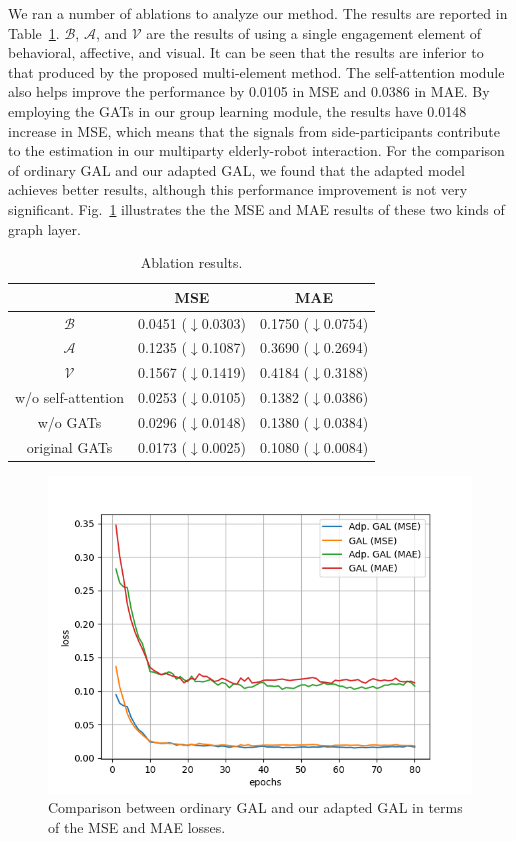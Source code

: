\documentclass[VANCOUVER,STIX1COL]{WileyNJD-v2}
\begin{document}
We ran a number of ablations to analyze our method. The results are reported in Table~\ref{t:ablations}. $\mathcal{B}$, $\mathcal{A}$, and $\mathcal{V}$ are the results of using a single engagement element of behavioral, affective, and visual. It can be seen that the results are inferior to that produced by the proposed multi-element method. The self-attention module also helps improve the performance by 0.0105 in MSE and 0.0386 in MAE. By employing the GATs in our group learning module, the results have 0.0148 increase in MSE, which means that the signals from side-participants contribute to the estimation in our multiparty elderly-robot interaction. For the comparison of ordinary GAL and our adapted GAL, we found that the adapted model achieves better results, although this performance improvement is not very significant. Fig.~\ref{f:gal_vs_adpgal} illustrates the the MSE and MAE results of these two kinds of graph layer.

\begin{table}[ht]
  \centering
  \caption{Ablation results.}
  \label{t:ablations}
  \begin{tabular}{ccc}
  \toprule
  \textbf{} & \textbf{MSE} & \textbf{MAE} \\
  \midrule
  $\mathcal{B}$ & 0.0451 ($\downarrow$0.0303) & 0.1750 ($\downarrow$0.0754) \\
  $\mathcal{A}$ & 0.1235 ($\downarrow$0.1087) & 0.3690 ($\downarrow$0.2694) \\
  $\mathcal{V}$ & 0.1567 ($\downarrow$0.1419) & 0.4184 ($\downarrow$0.3188) \\
  w/o self-attention & 0.0253 ($\downarrow$0.0105) & 0.1382 ($\downarrow$0.0386) \\
  w/o GATs & 0.0296 ($\downarrow$0.0148) & 0.1380 ($\downarrow$0.0384) \\
  original GATs & 0.0173 ($\downarrow$0.0025) & 0.1080 ($\downarrow$0.0084) \\
  \bottomrule
  \end{tabular}
\end{table}

\begin{figure}[t]
  \centering
  \includegraphics[width=0.65\linewidth]{assets/gal_vs_adpgal}
  \caption{Comparison between ordinary GAL and our adapted GAL in terms of the MSE and MAE losses.}
  \label{f:gal_vs_adpgal}
\end{figure}
\end{document}
